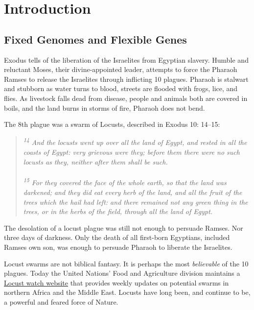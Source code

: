 \chapter{Introduction}  \label{Intro} 
\section{Fixed Genomes and Flexible Genes}
  \label{Intro:sec:Fixed Genomes and Flexible Genes} 

  Exodus tells of the liberation of the Israelites from Egyptian slavery. Humble and reluctant Moses, their divine-appointed leader, attempts to force the Pharaoh Ramses to release the Israelites through inflicting 10 plagues. Pharaoh is stalwart and stubborn as water turns to blood, streets are flooded with frogs, lice, and flies. As livestock falls dead from disease, people and animals both are covered in boils, and the land burns in storms of fire, Pharaoh does not bend.

  The 8th plague was a swarm of Locusts, described in Exodus 10: 14–15:

  \begin{quote}
    \itshape
    \singlespacing
    \textsuperscript{14} And the locusts went up over all the land of Egypt, and rested in all the coasts of Egypt: very grievous were they; before them there were no such locusts as they, neither after them shall be such.\\ 
      \\
    \textsuperscript{15} For they covered the face of the whole earth, so that the land was darkened; and they did eat every herb of the land, and all the fruit of the trees which the hail had left: and there remained not any green thing in the trees, or in the herbs of the field, through all the land of Egypt.
    \end{quote}

  The desolation of a locust plague was still not enough to persuade Ramses. Nor three days of darkness. Only the death of all first-born Egyptians, included Ramses own son, was enough to persuade Pharaoh to liberate the Israelites.

  Locust swarms are not biblical fantasy. It is perhaps the most \textit{believable} of the 10 plagues. Today the United Nations' Food and Agriculture division maintains a \href{http://www.fao.org/ag/locusts/en/info/info/news/index.html}{Locust watch website} that provides weekly updates on potential swarms in northern Africa and the Middle East. Locusts have long been, and continue to be, a powerful and feared force of Nature.

